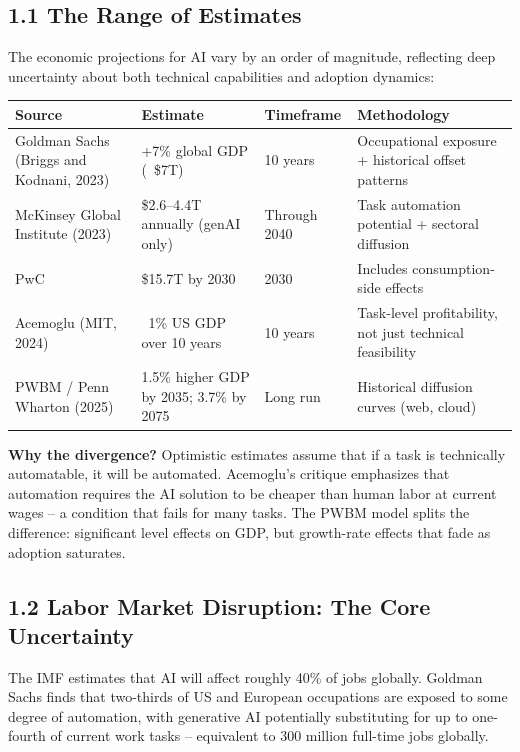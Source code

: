 \documentclass[11pt,a4paper]{article}
\begin{document}
\subsection{1.1 The Range of Estimates}

The economic projections for AI vary by an order of magnitude, reflecting deep uncertainty about both technical capabilities and adoption dynamics:

\begin{table}[h]
\centering\small
\begin{tabular}{@{llll@}}
\toprule
Source & Estimate & Timeframe & Methodology \\
\midrule
Goldman Sachs (Briggs and Kodnani, 2023) & +7\% global GDP (~\$7T) & 10 years & Occupational exposure + historical offset patterns \\
McKinsey Global Institute (2023) & \$2.6--4.4T annually (genAI only) & Through 2040 & Task automation potential + sectoral diffusion \\
PwC & \$15.7T by 2030 & 2030 & Includes consumption-side effects \\
Acemoglu (MIT, 2024) & ~1\% US GDP over 10 years & 10 years & Task-level profitability, not just technical feasibility \\
PWBM / Penn Wharton (2025) & 1.5\% higher GDP by 2035; 3.7\% by 2075 & Long run & Historical diffusion curves (web, cloud) \\
\bottomrule
\end{tabular}
\end{table}

\textbf{Why the divergence?} Optimistic estimates assume that if a task is technically automatable, it will be automated. Acemoglu's critique emphasizes that automation requires the AI solution to be cheaper than human labor at current wages -- a condition that fails for many tasks. The PWBM model splits the difference: significant level effects on GDP, but growth-rate effects that fade as adoption saturates.

\subsection{1.2 Labor Market Disruption: The Core Uncertainty}

The IMF estimates that AI will affect roughly 40\% of jobs globally. Goldman Sachs finds that two-thirds of US and European occupations are exposed to some degree of automation, with generative AI potentially substituting for up to one-fourth of current work tasks -- equivalent to 300 million full-time jobs globally.
\end{document}
